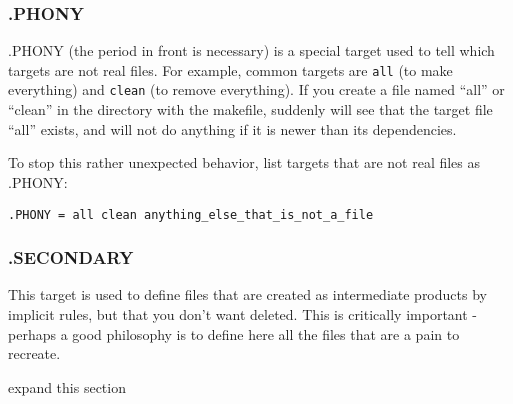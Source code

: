 \subsubsection{.PHONY}
.PHONY (the period in front is necessary) is a special target used to tell \maken{} which targets are not real files. For example, common targets are \texttt{all} (to make everything) and \texttt{clean} (to remove everything). If you create a file named ``all'' or ``clean'' in the directory with the makefile, suddenly \maken{} will see that the target file ``all'' exists, and will not do anything if it is newer than its dependencies.

To stop this rather unexpected behavior, list targets that are not real files as .PHONY:

\texttt{.PHONY = all clean anything_else_that_is_not_a_file}

\subsubsection{.SECONDARY}
This target is used to define files that are created as intermediate products by implicit rules, but that you don't want deleted. This is critically important - perhaps a good philosophy is to define here all the files that are a pain to recreate.

{\color{red} expand this section}


